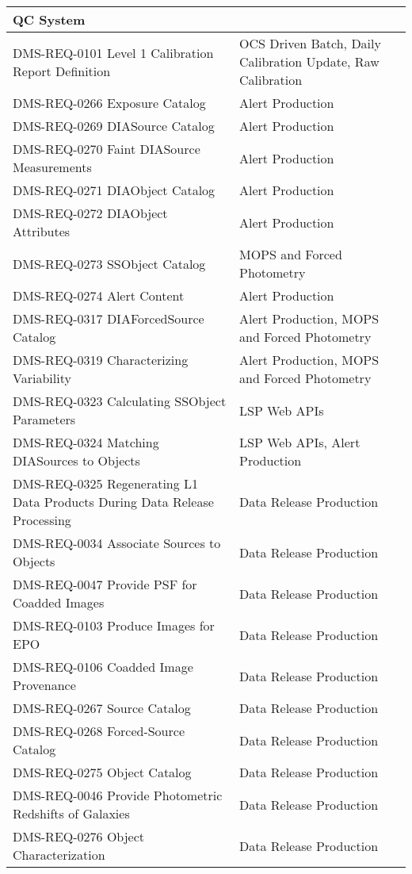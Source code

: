 \begin{xtabular}{p{0.4\textwidth}p{0.55\textwidth}}
QC System\\ \hline
DMS-REQ-0101 Level 1 Calibration Report Definition & OCS Driven Batch,
Daily Calibration Update, Raw Calibration\\ \hline
DMS-REQ-0266 Exposure Catalog & Alert Production\\ \hline
DMS-REQ-0269 DIASource Catalog & Alert Production\\ \hline
DMS-REQ-0270 Faint DIASource Measurements & Alert
Production\\ \hline
DMS-REQ-0271 DIAObject Catalog & Alert Production\\ \hline
DMS-REQ-0272 DIAObject Attributes & Alert Production\\ \hline
DMS-REQ-0273 SSObject Catalog & MOPS and Forced
Photometry\\ \hline
DMS-REQ-0274 Alert Content & Alert Production\\ \hline
DMS-REQ-0317 DIAForcedSource Catalog & Alert Production, MOPS and Forced
Photometry\\ \hline
DMS-REQ-0319 Characterizing Variability & Alert Production, MOPS and
Forced Photometry\\ \hline
DMS-REQ-0323 Calculating SSObject Parameters & LSP Web APIs\\ \hline
DMS-REQ-0324 Matching DIASources to Objects & LSP Web APIs, Alert
Production\\ \hline
DMS-REQ-0325 Regenerating L1 Data Products During Data Release
Processing & Data Release Production\\ \hline
DMS-REQ-0034 Associate Sources to Objects & Data Release
Production\\ \hline
DMS-REQ-0047 Provide PSF for Coadded Images & Data Release
Production\\ \hline
DMS-REQ-0103 Produce Images for EPO & Data Release
Production\\ \hline
DMS-REQ-0106 Coadded Image Provenance & Data Release
Production\\ \hline
DMS-REQ-0267 Source Catalog & Data Release Production\\ \hline
DMS-REQ-0268 Forced-Source Catalog & Data Release
Production\\ \hline
DMS-REQ-0275 Object Catalog & Data Release Production\\ \hline
DMS-REQ-0046 Provide Photometric Redshifts of Galaxies & Data Release
Production\\ \hline
DMS-REQ-0276 Object Characterization & Data Release
Production\\ \hline

\end{xtabular}
